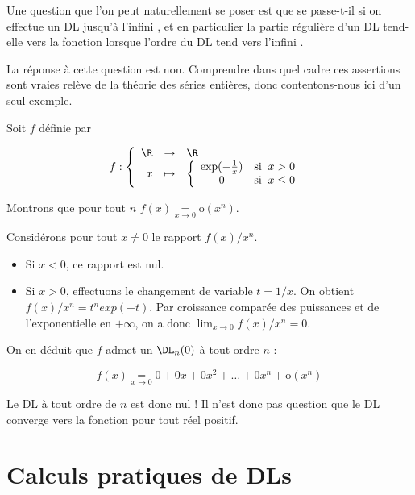 \documentclass[12pt]{article}
\begin{document}
Une question que l'on peut naturellement se poser est \og que se passe-t-il
si on effectue un DL jusqu'à l'infini \fg, et en particulier \og la partie
régulière d'un DL tend-elle vers la fonction lorsque l'ordre du DL tend
vers l'infini \fg.

La réponse à cette question est non. Comprendre dans quel cadre ces
assertions sont vraies relève de la théorie des séries entières, donc
contentons-nous ici d'un seul exemple.

Soit $f$ définie par

\[
f : \left\{
\begin{array}{rcl}
\R  & \to & \R \\
x & \mapsto & \left\{
\begin{array}{cl} 
  \exp(-\frac{1}{x}) & \text{si}\;\; x > 0\\
  0 & \text{si}\;\; x\leq 0 
\end{array}
\right.
\end{array}
\right.
\]

Montrons que pour tout $n$ $f(x)\underset{x\rightarrow 0}{=}
\text{o}(x^n)$. 

Considérons pour tout $x\neq 0$ le rapport $f(x)/x^n$. 

\begin{itemize}

\item Si $x<0$, ce rapport est nul. 

\item Si $x>0$, effectuons le changement de variable $t=1/x$. On obtient
  $f(x)/x^n = t^n exp(-t)$. Par croissance comparée des puissances et de
  l'exponentielle en $+\infty$, on a donc $\lim_{x\rightarrow
  0}f(x)/x^n=0$.
 
\end{itemize}

On en déduit que $f$ admet un $\DL_n(0)$ à tout ordre $n$ :

$$f(x)\underset{x\rightarrow 0}{=} 0+0x+0x^2+\dots+0x^n+\text{o}(x^n)$$

Le DL à tout ordre de $n$ est donc nul ! Il n'est donc pas question que le
DL \og converge \fg\; vers la fonction pour tout réel positif.

\section{Calculs pratiques de DLs}
\end{document}
